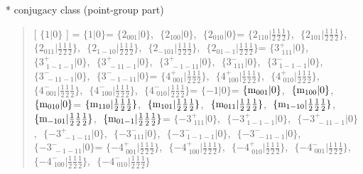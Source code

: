 \documentclass[fleqn,10pt,landscape]{jsarticle}
\begin{document}
* conjugacy class (point-group part)
\begin{quote}
[ $\{1|0\}$ ] = \quad $\{1|0\}$\newline[ $\{2{}_{001}|0\}$ ] = \quad $\{2{}_{001}|0\}$,\,\, $\{2{}_{100}|0\}$,\,\, $\{2{}_{010}|0\}$ = \quad $\{2{}_{110}|\frac{1}{2} \frac{1}{2} \frac{1}{2}\}$,\,\, $\{2{}_{101}|\frac{1}{2} \frac{1}{2} \frac{1}{2}\}$,\,\, $\{2{}_{011}|\frac{1}{2} \frac{1}{2} \frac{1}{2}\}$,\,\, $\{2{}_{1-10}|\frac{1}{2} \frac{1}{2} \frac{1}{2}\}$,\,\, $\{2{}_{-101}|\frac{1}{2} \frac{1}{2} \frac{1}{2}\}$,\,\, $\{2{}_{01-1}|\frac{1}{2} \frac{1}{2} \frac{1}{2}\}$\newline[ $\{3^{+}_{\,\,111}|0\}$ ] = \quad $\{3^{+}_{\,\,111}|0\}$,\,\, $\{3^{+}_{\,\,1-1-1}|0\}$,\,\, $\{3^{+}_{\,\,-11-1}|0\}$,\,\, $\{3^{+}_{\,\,-1-11}|0\}$,\,\, $\{3^{-}_{\,\,111}|0\}$,\,\, $\{3^{-}_{\,\,1-1-1}|0\}$,\,\, $\{3^{-}_{\,\,-11-1}|0\}$,\,\, $\{3^{-}_{\,\,-1-11}|0\}$ = \quad $\{4^{+}_{\,\,001}|\frac{1}{2} \frac{1}{2} \frac{1}{2}\}$,\,\, $\{4^{+}_{\,\,100}|\frac{1}{2} \frac{1}{2} \frac{1}{2}\}$,\,\, $\{4^{+}_{\,\,010}|\frac{1}{2} \frac{1}{2} \frac{1}{2}\}$,\,\, $\{4^{-}_{\,\,001}|\frac{1}{2} \frac{1}{2} \frac{1}{2}\}$,\,\, $\{4^{-}_{\,\,100}|\frac{1}{2} \frac{1}{2} \frac{1}{2}\}$,\,\, $\{4^{-}_{\,\,010}|\frac{1}{2} \frac{1}{2} \frac{1}{2}\}$\newline[ $\{-1|0\}$ ] = \quad $\{-1|0\}$\newline[ $\{{\rm m}_{001}|0\}$ ] = \quad $\{{\rm m}_{001}|0\}$,\,\, $\{{\rm m}_{100}|0\}$,\,\, $\{{\rm m}_{010}|0\}$ = \quad $\{{\rm m}_{110}|\frac{1}{2} \frac{1}{2} \frac{1}{2}\}$,\,\, $\{{\rm m}_{101}|\frac{1}{2} \frac{1}{2} \frac{1}{2}\}$,\,\, $\{{\rm m}_{011}|\frac{1}{2} \frac{1}{2} \frac{1}{2}\}$,\,\, $\{{\rm m}_{1-10}|\frac{1}{2} \frac{1}{2} \frac{1}{2}\}$,\,\, $\{{\rm m}_{-101}|\frac{1}{2} \frac{1}{2} \frac{1}{2}\}$,\,\, $\{{\rm m}_{01-1}|\frac{1}{2} \frac{1}{2} \frac{1}{2}\}$\newline[ $\{-3^{+}_{\,\,111}|0\}$ ] = \quad $\{-3^{+}_{\,\,111}|0\}$,\,\, $\{-3^{+}_{\,\,1-1-1}|0\}$,\,\, $\{-3^{+}_{\,\,-11-1}|0\}$,\,\, $\{-3^{+}_{\,\,-1-11}|0\}$,\,\, $\{-3^{-}_{\,\,111}|0\}$,\,\, $\{-3^{-}_{\,\,1-1-1}|0\}$,\,\, $\{-3^{-}_{\,\,-11-1}|0\}$,\,\, $\{-3^{-}_{\,\,-1-11}|0\}$ = \quad $\{-4^{+}_{\,\,001}|\frac{1}{2} \frac{1}{2} \frac{1}{2}\}$,\,\, $\{-4^{+}_{\,\,100}|\frac{1}{2} \frac{1}{2} \frac{1}{2}\}$,\,\, $\{-4^{+}_{\,\,010}|\frac{1}{2} \frac{1}{2} \frac{1}{2}\}$,\,\, $\{-4^{-}_{\,\,001}|\frac{1}{2} \frac{1}{2} \frac{1}{2}\}$,\,\, $\{-4^{-}_{\,\,100}|\frac{1}{2} \frac{1}{2} \frac{1}{2}\}$,\,\, $\{-4^{-}_{\,\,010}|\frac{1}{2} \frac{1}{2} \frac{1}{2}\}$\newline
\end{quote}
\end{document}
